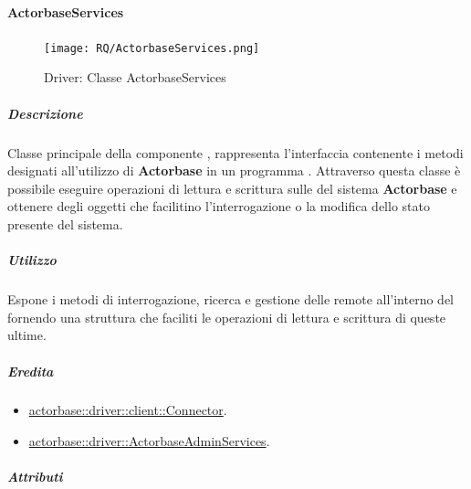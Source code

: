 \documentclass{scalatekids-article}
\begin{document}
\paragraph{ActorbaseServices}
\label{sec:actorbase::driver::ActorbaseServices}

\begin{figure}[H]
  \begin{center}
    \texttt{[image: RQ/ActorbaseServices.png]}
    \caption{Driver: Classe ActorbaseServices}
  \end{center}
\end{figure}

\subparagraph{Descrizione}

Classe principale della componente , rappresenta l'interfaccia
contenente i metodi designati all'utilizzo di \textbf{Actorbase} in un programma
. Attraverso questa classe è possibile eseguire operazioni di lettura
e scrittura sulle  del sistema \textbf{Actorbase} e ottenere
degli oggetti che facilitino l'interrogazione o la modifica dello stato presente
del sistema.

\subparagraph{Utilizzo}

Espone i metodi di interrogazione, ricerca e gestione delle 
remote all'interno del  fornendo una struttura che faciliti
le operazioni di lettura e scrittura di queste ultime.

\subparagraph{Eredita}

\begin{itemize}
\item \hyperref[sec:actorbase::driver::client::Connector]{actorbase::driver::client::Connector}.
\item \hyperref[sec:actorbase::driver::ActorbaseAdminServices]{actorbase::driver::ActorbaseAdminServices}.
\end{itemize}

\subparagraph{Attributi}
\end{document}
